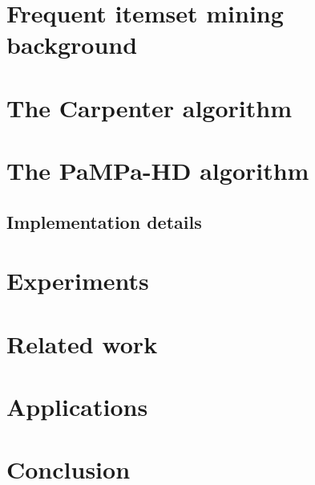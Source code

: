 \documentclass[preprint,review,12pt]{elsarticle}
\begin{document}
\section{Frequent itemset mining background}
\label{Preliminaries}



\section{The Carpenter algorithm}
\label{Carpenter algorithm}



\section{The PaMPa-HD algorithm}
\label{Distributed implementation outline}




\subsection{Implementation details}
\label{MapReduce Carpenter}

%
%


\section{Experiments}
\label{Experiments}




\section{Related work}
\label{Related work}



\section{Applications}
\label{Applications}



\section{Conclusion} \label{Conclusion}






{}

\end{document}
